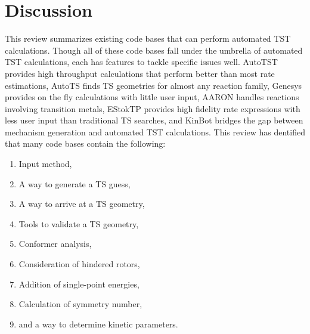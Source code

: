 \documentclass[preprint, 11pt]{elsarticle} %
\begin{document}

\section{Discussion}
%

This review summarizes existing code bases that can perform automated TST calculations.
Though all of these code bases fall under the umbrella of automated TST calculations, each has features to tackle specific issues well.
AutoTST provides high throughput calculations that perform better than most rate estimations, AutoTS finds TS geometries for almost any reaction family, Genesys provides on the fly calculations with little user input, AARON handles reactions involving transition metals, EStokTP provides high fidelity rate expressions with less user input than traditional TS searches, and KinBot bridges the gap between mechanism generation and automated TST calculations. 
This review has dentified that many code bases contain the following:
\begin{enumerate}
    \item Input method,
    \item A way to generate a TS guess,
    \item A way to arrive at a TS geometry,
    \item Tools to validate a TS geometry,
    \item Conformer analysis,
    \item Consideration of hindered rotors,
    \item Addition of single-point energies,
    \item Calculation of symmetry number,
    \item and a way to determine kinetic parameters.
\end{enumerate}
\end{document}
